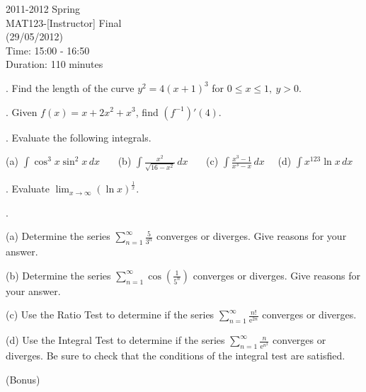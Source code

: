 \documentclass{article}
\begin{document}
\pagestyle{empty}
\large

\begin{center}
2011-2012 Spring \\MAT123-[Instructor] Final\\(29/05/2012)\\Time: 15:00 - 16:50\\Duration: 110 minutes
\end{center}

. Find the length of the curve $y^2=4(x+1)^3$ for $0\leq x\leq1,\: y>0$.

\hfill

. Given $f(x)=x+2x^2+x^3$, find $\left(f^{-1}\right)'(4)$.

\hfill

. Evaluate the following integrals.

\hfill

(a) $\displaystyle\int\cos^3x\sin^2x\,dx$ \ \ \ (b) $\displaystyle\int\frac{x^2}{\sqrt{16-x^2}}\,dx$ \ \ \ (c) $\displaystyle\int\frac{x^3-1}{x^3-x}\,dx$ \ \  (d) $\displaystyle\int x^{123}\ln x\,dx$

\hfill

. Evaluate $\displaystyle\lim_{x\to\infty}(\ln x)^{\textstyle\frac1x}$.

\hfill

.

\hfill

\noindent (a) Determine the series  $\displaystyle\sum_{n=1}^\infty{\frac5{3^n}}$ converges or diverges. Give reasons for your answer.

\hfill

\noindent (b) Determine the series $\displaystyle\sum_{n=1}^\infty\cos\left(\frac1{5^n}\right)$ converges or diverges. Give reasons for your answer.

\hfill

\noindent (c) Use the Ratio Test to determine if the series $\displaystyle\sum_{n=1}^\infty\frac{n!}{\mathrm{e}^{2n}}$ converges or diverges.

\hfill

\noindent (d) Use the Integral Test to determine if the series $\displaystyle\sum_{n=1}^\infty\frac n{\mathrm{e}^{n^2}}$ converges or diverges. Be sure to check that the conditions of the integral test are satisfied.

\hfill

\noindent (Bonus)

\hfill
\end{document}
